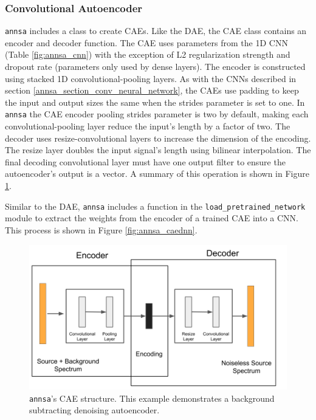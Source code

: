 \subsubsection{Convolutional Autoencoder}

\verb|annsa| includes a class to create CAEs. Like the DAE, the CAE class contains an encoder and decoder function. The CAE uses parameters from the 1D CNN (Table \ref{fig:annsa_cnn}) with the exception of L2 regularization strength and dropout rate (parameters only used by dense layers). The encoder is constructed using stacked 1D convolutional-pooling layers. As with the CNNs described in section \ref{annsa_section_conv_neural_network}, the CAEs use padding to keep the input and output sizes the same when the strides parameter is set to one. In \verb|annsa| the CAE encoder pooling strides parameter is two by default, making each convolutional-pooling layer reduce the input's length by a factor of two. The decoder uses resize-convolutional layers to increase the dimension of the encoding. The resize layer doubles the input signal's length using bilinear interpolation. The final decoding convolutional layer must have one output filter to ensure the autoencoder's output is a vector. A summary of this operation is shown in Figure \ref{fig:annsa_cae}.

Similar to the DAE, \verb|annsa| includes a function in the \verb|load_pretrained_network| module to extract the weights from the encoder of a trained CAE into a CNN. This process is shown in Figure \ref{fig:annsa_caednn}.

\begin{figure}[H]
\centering
\includegraphics[trim=0 0 30 0,clip,width=1.0\linewidth]{images/annsa_cae.png}
\caption{\texttt{annsa}'s CAE structure. This example demonstrates a background subtracting denoising autoencoder.}
\label{fig:annsa_cae}
\end{figure}

